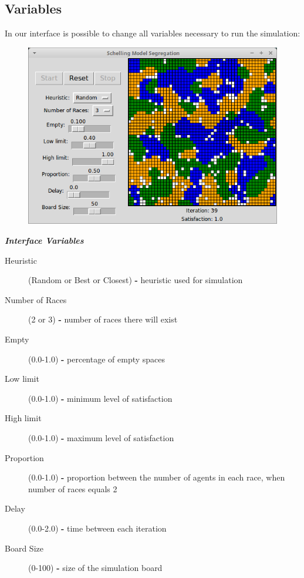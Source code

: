 \documentclass[a4paper,titlepage,11pt]{article}
\begin{document}
\newpage

\subsection{Variables}
In our interface is possible to change all variables necessary to run the simulation:

\begin{figure}[h]
    \centering
    \includegraphics[scale=0.50]{img/interface.png}
\end{figure}

\textit{ \textbf{Interface Variables} }

\begin{description}
\item [ Heuristic ] (Random or Best or Closest) \textbf{-} heuristic used for simulation
\item [ Number of Races ] (2 or 3) \textbf{-} number of races there will exist
\item [ Empty ] (0.0-1.0) \textbf{-} percentage of empty spaces
\item [ Low limit ] (0.0-1.0) \textbf{-} minimum level of satisfaction
\item [ High limit ] (0.0-1.0) \textbf{-} maximum level of satisfaction
\item [ Proportion ] (0.0-1.0) \textbf{-} proportion between the number of agents in each race, when number of races equals 2
\item [ Delay ] (0.0-2.0) \textbf{-} time between each iteration
\item [ Board Size ] (0-100) \textbf{-} size of the simulation board
\end{description}
\end{document}
